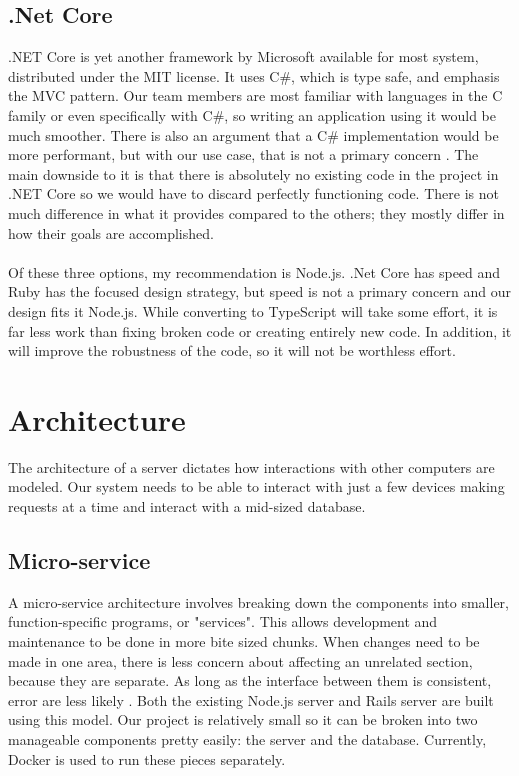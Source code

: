     \subsection{.Net Core}
       .NET Core is yet another framework by Microsoft available for most system, distributed under the MIT license. It uses C\#, which is type safe, and emphasis the MVC pattern. Our team members are most familiar with languages in the C family or even specifically with C\#, so writing an application using it would be much smoother. There is also an argument that a C\# implementation would be more performant, but with our use case, that is not a primary concern \cite{dotnet}. The main downside to it is that there is absolutely no existing code in the project in .NET Core so we would have to discard perfectly functioning code. There is not much difference in what it provides compared to the others; they mostly differ in how their goals are accomplished.
\\\\
       \indent Of these three options, my recommendation is Node.js. .Net Core has speed and Ruby has the focused design strategy, but speed is not a primary concern and our design fits it Node.js. While converting to TypeScript will take some effort, it is far less work than fixing broken code or creating entirely new code. In addition, it will improve the robustness of the code, so it will not be worthless effort.

\break

\section{Architecture}
    The architecture of a server dictates how interactions with other computers are modeled. Our system needs to be able to interact with just a few devices making requests at a time and interact with a mid-sized database.
    \subsection{Micro-service} A micro-service architecture involves breaking down the components into smaller, function-specific programs, or "services". This allows development and maintenance to be done in more bite sized chunks. When changes need to be made in one area, there is less concern about affecting an unrelated section, because they are separate. As long as the interface between them is consistent, error are less likely \cite{microserv}. Both the existing Node.js server and Rails server are built using this model. Our project is relatively small so it can be broken into two manageable components pretty easily: the server and the database. Currently, Docker is used to run these pieces separately.

